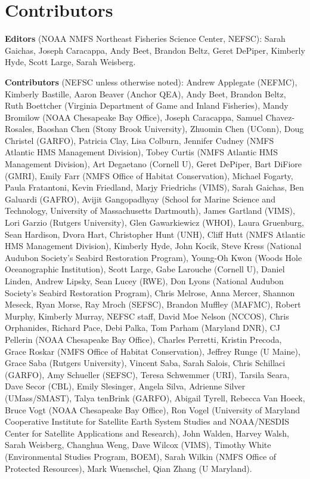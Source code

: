 \documentclass[
  10pt,
]{article}
\begin{document}
\hypertarget{contributors}{%
\section{Contributors}\label{contributors}}

\textbf{Editors} (NOAA NMFS Northeast Fisheries Science Center, NEFSC): Sarah Gaichas, Joseph Caracappa, Andy Beet, Brandon Beltz, Geret DePiper, Kimberly Hyde, Scott Large, Sarah Weisberg.

\textbf{Contributors} (NEFSC unless otherwise noted): Andrew Applegate (NEFMC), Kimberly Bastille, Aaron Beaver (Anchor QEA), Andy Beet, Brandon Beltz, Ruth Boettcher (Virginia Department of Game and Inland Fisheries), Mandy Bromilow (NOAA Chesapeake Bay Office), Joseph Caracappa, Samuel Chavez-Rosales, Baoshan Chen (Stony Brook University), Zhuomin Chen (UConn), Doug Christel (GARFO), Patricia Clay, Lisa Colburn, Jennifer Cudney (NMFS Atlantic HMS Management Division), Tobey Curtis (NMFS Atlantic HMS Management Division), Art Degaetano (Cornell U), Geret DePiper, Bart DiFiore (GMRI), Emily Farr (NMFS Office of Habitat Conservation), Michael Fogarty, Paula Fratantoni, Kevin Friedland, Marjy Friedrichs (VIMS), Sarah Gaichas, Ben Galuardi (GAFRO), Avijit Gangopadhyay (School for Marine Science and Technology, University of Massachusetts Dartmouth), James Gartland (VIMS), Lori Garzio (Rutgers University), Glen Gawarkiewicz (WHOI), Laura Gruenburg, Sean Hardison, Dvora Hart, Christopher Hunt (UNH), Cliff Hutt (NMFS Atlantic HMS Management Division), Kimberly Hyde, John Kocik, Steve Kress (National Audubon Society's Seabird Restoration Program), Young-Oh Kwon (Woods Hole Oceanographic Institution), Scott Large, Gabe Larouche (Cornell U), Daniel Linden, Andrew Lipsky, Sean Lucey (RWE), Don Lyons (National Audubon Society's Seabird Restoration Program), Chris Melrose, Anna Mercer, Shannon Meseck, Ryan Morse, Ray Mroch (SEFSC), Brandon Muffley (MAFMC), Robert Murphy, Kimberly Murray, NEFSC staff, David Moe Nelson (NCCOS), Chris Orphanides, Richard Pace, Debi Palka, Tom Parham (Maryland DNR), CJ Pellerin (NOAA Chesapeake Bay Office), Charles Perretti, Kristin Precoda, Grace Roskar (NMFS Office of Habitat Conservation), Jeffrey Runge (U Maine), Grace Saba (Rutgers University), Vincent Saba, Sarah Salois, Chris Schillaci (GARFO), Amy Schueller (SEFSC), Teresa Schwemmer (URI), Tarsila Seara, Dave Secor (CBL), Emily Slesinger, Angela Silva, Adrienne Silver (UMass/SMAST), Talya tenBrink (GARFO), Abigail Tyrell, Rebecca Van Hoeck, Bruce Vogt (NOAA Chesapeake Bay Office), Ron Vogel (University of Maryland Cooperative Institute for Satellite Earth System Studies and NOAA/NESDIS Center for Satellite Applications and Research), John Walden, Harvey Walsh, Sarah Weisberg, Changhua Weng, Dave Wilcox (VIMS), Timothy White (Environmental Studies Program, BOEM), Sarah Wilkin (NMFS Office of Protected Resources), Mark Wuenschel, Qian Zhang (U Maryland).
\end{document}
